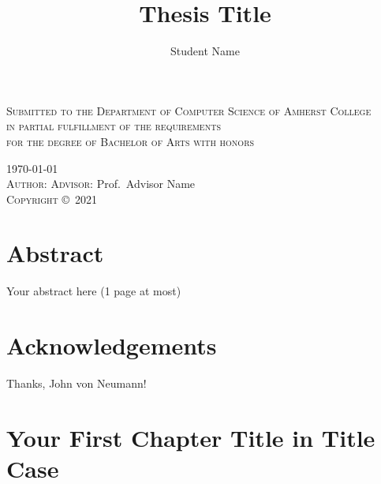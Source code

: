 \documentclass[11pt,twoside,openright]{report}
\author{Student Name}
\title{Thesis Title}
\newcommand{\classyear}{2021} %
\newcommand{\advisor}{Advisor Name} %
\begin{document}

\begin{titlepage}
  \centering
  {\LARGE\makeatletter\textbf{\MakeUppercase\@title}\makeatother}\par
  \vspace{0.6\baselineskip}
  {\scshape Submitted to the Department of Computer Science of Amherst
    College\\[0.5\baselineskip]
    in partial fulfillment of the requirements \\[0.5\baselineskip]
    for the degree of Bachelor of Arts with honors
  }\par
  \vspace{0.6\baselineskip}
  \textsc{\today}\\[1in] %
  \vspace{8\baselineskip}
  {\textsc{Author:} \makeatletter\@author\makeatother%
  \hfill\textsc{Advisor:} Prof.\ \advisor}\\[0.6\baselineskip]
  \vfill
  \textsc{Copyright} \copyright\ \textsc{\classyear}\ %
  {\scshape \makeatletter\@author\makeatother}
\end{titlepage}


\chapter*{Abstract} %

Your abstract here (1 page at most)

\chapter*{Acknowledgements} %

Thanks, John von Neumann!

\tableofcontents %

\doublespacing%

\chapter{Your First Chapter Title in Title Case}

\lipsum%


\end{document}
